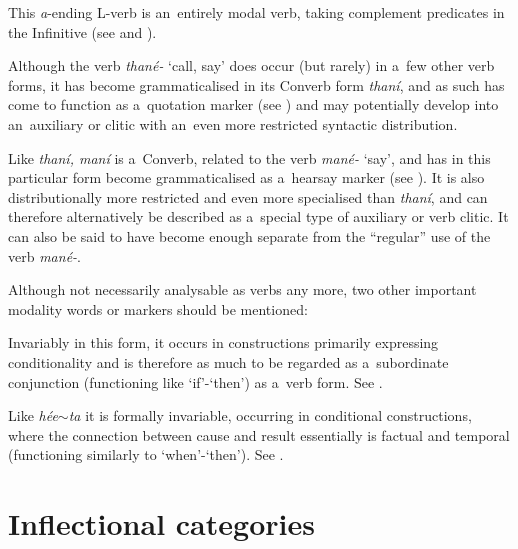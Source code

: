  This \textit{a}-ending L-verb is an~entirely modal verb, taking complement predicates in the Infinitive (see  and ).



 Although the verb \textit{thané-} `call, say' does occur (but rarely) in a~few other verb forms, it has become grammaticalised in its Converb form \textit{thaní}, and as such has come to function as a~quotation marker (see ) and may potentially develop into an~auxiliary or clitic with an~even more restricted syntactic distribution.



 Like \textit{thaní, maní} is a~Converb, related to the verb \textit{mané-} `say', and has in this particular form become grammaticalised as a~hearsay marker (see ). It is also distributionally more restricted and even more specialised than \textit{thaní}, and can therefore alternatively be described as a~special type of auxiliary or verb clitic. It can also be said to have become enough separate from the ``regular'' use of the verb \textit{mané-}.



Although not necessarily analysable as verbs any more, two other important modality words or markers should be mentioned:



 Invariably in this form, it occurs in constructions primarily expressing conditionality and is therefore as much to be regarded as a~subordinate conjunction (functioning like `if'-`then') as a~verb form. See .



 Like \textit{hée$\sim$ta} it is formally invariable, occurring in conditional constructions, where the connection between cause and result essentially is factual and temporal (functioning similarly to `when'-`then'). See .


\section{Inflectional categories}
\label{sec:8-4}

